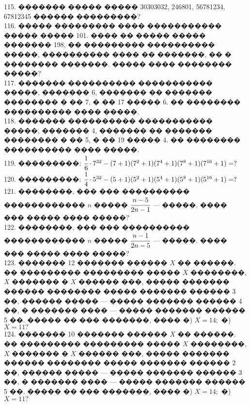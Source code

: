 \documentclass[12pt]{article}
\begin{document}
115. ������� ����� ����� 30303032, 246801, 56781234, 67812345 ������ ���������?\\
116. ����� ��������� ���� ����������� ����� ����� 101. ���� �� ����� ����� ������� 198, �� ��������� ���������� �����, ���������� ���� �� �������, �� � �������� �������. ����� ���� �������� �����?\\
117. ������� ���������� ����������� �����, ������� 6, ������� �� ������� �������� � �� 7, � �� 17 ����� 6. �� �������� ���������� ���� �����.\\
118. ������� ���������� ����������� �����, ������� 4, ������� �� ������� �������� � �� 5, � �� 19 ����� 4. �� �������� ���������� ���� �����.\\
119. ���������: $\cfrac{1}{6}\cdot 7^{32}-(7+1)(7^2+1)(7^4+1)(7^8+1)(7^{16}+1)=?$\\
120. ���������: $\cfrac{1}{4}\cdot 5^{32}-(5+1)(5^2+1)(5^4+1)(5^8+1)(5^{16}+1)=?$\\
121. ��������, ��� ��� ���������� ������������ $n$ ����� $\cfrac{n - 5}{2n - 1}$ --- �����. ���� ��� ����� ����
�����?\\
122. ��������, ��� ��� ���������� ������������ $n$ ����� $\cfrac{n - 1}{2n - 5}$ --- �����. ���� ��� ����� ����
�����?\\
123. ������� 12 ������� ������ $X$ �� ������. �� ��������� ��������� ����� $X$ ��������, $X$ ������� � $X$ ������ ���, ����� ������� ������ �������� ����� ������� ������ 3 ��, ������ ����� ---
����� ������� ������ 4 ��, � ������� ���� --- ����� ������� ������ 5 ��. ����� �� ��� �������, ���� �) $X = 14;$ �) $X = 11?$\\
124. ������� 10 ������� ������ $X$ �� ������. �� ��������� ��������� ����� $X$ ��������, $X$ ������� � $X$ ������ ���, ����� ������� ������ �������� ����� ������� ������ 2 ��, ������ ����� ---
����� ������� ������ 3 ��, � ������� ���� --- ����� ������� ������ 5 ��. ����� �� ��� �������, ���� �) $X = 14;$ �) $X = 11?$
\newpage
\end{document}
